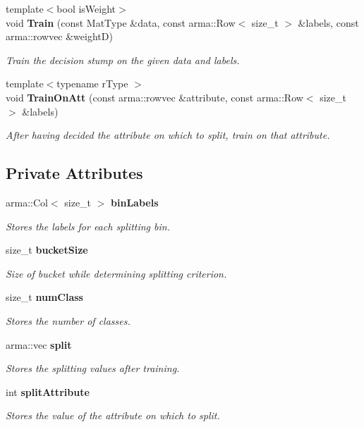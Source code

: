 \begin{DoxyCompactItemize}
{\footnotesize template$<$bool is\-Weight$>$ }\\void {\bf Train} (const Mat\-Type \&data, const arma\-::\-Row$<$ size\-\_\-t $>$ \&labels, const arma\-::rowvec \&weight\-D)
\begin{DoxyCompactList}\small\item\em Train the decision stump on the given data and labels. \end{DoxyCompactList}\item 
{\footnotesize template$<$typename r\-Type $>$ }\\void {\bf Train\-On\-Att} (const arma\-::rowvec \&attribute, const arma\-::\-Row$<$ size\-\_\-t $>$ \&labels)
\begin{DoxyCompactList}\small\item\em After having decided the attribute on which to split, train on that attribute. \end{DoxyCompactList}\end{DoxyCompactItemize}
\subsection*{Private Attributes}
\begin{DoxyCompactItemize}
\item 
arma\-::\-Col$<$ size\-\_\-t $>$ {\bf bin\-Labels}
\begin{DoxyCompactList}\small\item\em Stores the labels for each splitting bin. \end{DoxyCompactList}\item 
size\-\_\-t {\bf bucket\-Size}
\begin{DoxyCompactList}\small\item\em Size of bucket while determining splitting criterion. \end{DoxyCompactList}\item 
size\-\_\-t {\bf num\-Class}
\begin{DoxyCompactList}\small\item\em Stores the number of classes. \end{DoxyCompactList}\item 
arma\-::vec {\bf split}
\begin{DoxyCompactList}\small\item\em Stores the splitting values after training. \end{DoxyCompactList}\item 
int {\bf split\-Attribute}
\begin{DoxyCompactList}\small\item\em Stores the value of the attribute on which to split. \end{DoxyCompactList}\end{DoxyCompactItemize}


